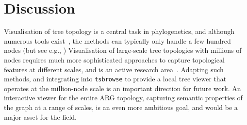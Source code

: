 \documentclass[unnumsec,webpdf,contemporary,large,namedate]{oup-authoring-template}%
\begin{document}

\section{Discussion} \label{sec:Discussion}
Visualisation of tree topology is a central task in phylogenetics,
and although numerous tools
exist~\citep[e.g.][]{huson2007dendroscope,vaughan2017icytree},
the methods can typically only handle a few hundred nodes 
(but see e.g., \citet{hadfield2018nextstrain})
Visualisation of large-scale tree topologies with millions of nodes
requires much more sophisticated approaches
to capture topological features at different scales,
and is an active research area~\citep{wong2022dynamic,kramer2023treenome}.
Adapting such methods, and integrating into \texttt{tsbrowse} to provide
a local tree viewer that operates at the million-node scale
is an important direction for future work.
An interactive viewer for the entire ARG topology, capturing
semantic properties of the graph at a range of scales, is an even more
ambitious goal, and would be a major asset for the field.

\end{document}
